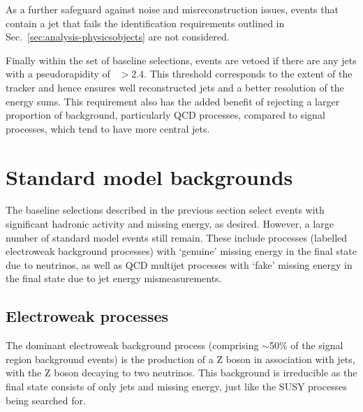 As a further safeguard against noise and misreconstruction issues, events that 
contain a jet that fails the identification requirements outlined in 
Sec.~\ref{sec:analysis-physicsobjects} are not considered.

Finally within the set of baseline selections, events are vetoed if there are 
any jets with a pseudorapidity of \etaabs~$>2.4$. This threshold 
corresponds to the extent of the tracker and hence ensures well reconstructed 
jets and a better resolution of the energy sums. This requirement also has the 
added benefit of rejecting a larger proportion of background, particularly QCD 
processes, compared to signal processes, which tend to have more central 
jets.

\section{Standard model backgrounds}

The baseline selections described in the previous section select events with 
significant hadronic activity and missing energy, as desired. However, a large 
number of standard model events still remain. These include processes (labelled 
electroweak background processes) with `genuine' missing energy in the final 
state due to neutrinos, as well as QCD multijet processes with `fake' missing 
energy in the final state due to jet energy mismeasurements.


\subsection{Electroweak processes}

The dominant electroweak background process (comprising $\sim$50\% of the 
signal region background events) is the production of a Z boson in 
association with jets, with the Z boson decaying to two neutrinos. This 
background is irreducible as the final state consists of only jets and missing 
energy, just like the SUSY processes being searched for.


